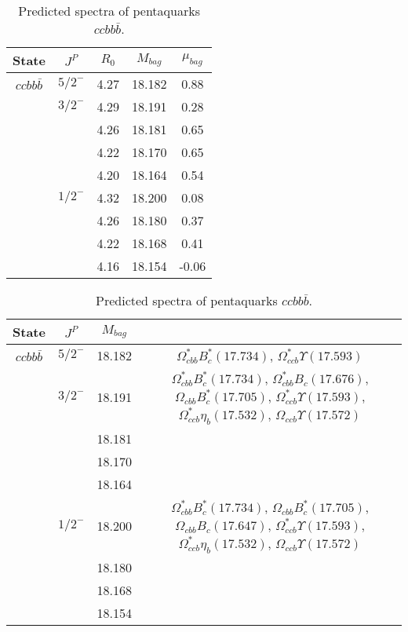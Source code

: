 \documentclass[prd,twocolumn,floatfix,nofootinbib]{revtex4}
\begin{document}
\renewcommand{\tabcolsep}{0.5cm}
\renewcommand{\arraystretch}{1.2}
\begin{table*}[!htbp]
    \caption{Predicted spectra of pentaquarks $ccbb\bar{b}$.}
    \begin{tabular}{ccccc}
        \hline\hline
        {\rm State} &$J^{P}$ &$R_{0}$ &$M_{bag}$ &$\mu_{bag}$ \\ \hline
        ${ccbb\bar{b}}$
        &${5/2}^{-}$    &4.27   &18.182 &0.88 \\
        &${3/2}^{-}$    &4.29   &18.191 &0.28 \\
        &               &4.26   &18.181 &0.65 \\
        &               &4.22   &18.170 &0.65 \\
        &               &4.20   &18.164 &0.54 \\
        &${1/2}^{-}$    &4.32   &18.200 &0.08 \\
        &               &4.26   &18.180 &0.37 \\
        &               &4.22   &18.168 &0.41 \\
        &               &4.16   &18.154 &-0.06 \\
        \hline\hline
    \end{tabular}
\end{table*}

\renewcommand{\tabcolsep}{0.5cm}
\renewcommand{\arraystretch}{1.2}
\begin{table*}[!htbp]
    \caption{Predicted spectra of pentaquarks $ccbb\bar{b}$.}
    \begin{tabular}{cccc}
        \hline\hline
        {\rm State} &$J^{P}$ &$M_{bag}$ &    \\ \hline
        ${ccbb\bar{b}}$
        &${5/2}^{-}$    &18.182 &$\Omega^{\ast}_{cbb} B^{\ast}_{c}(17.734)$, $\Omega^{\ast}_{ccb} \Upsilon(17.593)$\\
        &${3/2}^{-}$    &18.191 &$\Omega^{\ast}_{cbb} B^{\ast}_{c}(17.734)$, $\Omega^{\ast}_{cbb} B_{c}(17.676)$, $\Omega_{cbb} B^{\ast}_{c}(17.705)$, $\Omega^{\ast}_{ccb} \Upsilon(17.593)$, $\Omega^{\ast}_{ccb} \eta_{b}(17.532)$, $\Omega_{ccb} \Upsilon(17.572)$ \\
        &               &18.181 & \\
        &               &18.170 & \\
        &               &18.164 & \\
        &${1/2}^{-}$    &18.200 &$\Omega^{\ast}_{cbb} B^{\ast}_{c}(17.734)$, $\Omega_{cbb} B^{\ast}_{c}(17.705)$, $\Omega_{cbb} B_{c}(17.647)$, $\Omega^{\ast}_{ccb} \Upsilon(17.593)$, $\Omega^{\ast}_{ccb} \eta_{b}(17.532)$, $\Omega_{ccb} \Upsilon(17.572)$ \\
        &               &18.180 & \\
        &               &18.168 & \\
        &               &18.154 & \\
        \hline\hline
    \end{tabular}
\end{table*}
\end{document}
